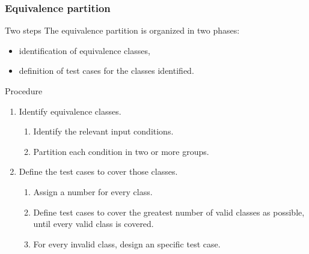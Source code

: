 \begin{frame}
\frametitle{Equivalence partition}
\label{procedure:equivalence-partition}

\begin{block:fact}{Two steps}
The equivalence partition is organized in two phases:
\begin{itemize}
	\item identification of equivalence classes,
	\item definition of test cases for the classes identified.
\end{itemize}
\end{block:fact}


\begin{block:procedure}{Procedure}
\begin{enumerate}
	\item Identify equivalence classes.
	\begin{enumerate}
		\item Identify the relevant input conditions.
		\item Partition each condition in two or more groups.
	\end{enumerate}

	\item Define the test cases to cover those classes.
	\begin{enumerate}
		\item Assign a number for every class.
		\item Define test cases to cover the greatest number of valid classes
		as possible, until every valid class is covered.
		\item For every invalid class, design an specific test case.
	\end{enumerate}
\end{enumerate}
\end{block:procedure}

\hfill
{}
\end{frame}


